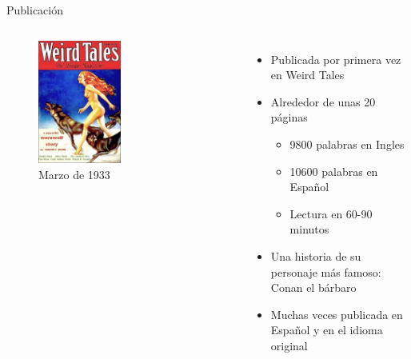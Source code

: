 \begin{frame}{Publicación}
\begin{columns}
    \begin{figure}[htb]
    \centering
        \includegraphics[width=0.5\textwidth]{img/WeirdTales-1933-03}
        \caption{Marzo de 1933}
    \end{figure}
    \begin{itemize}
         \item Publicada por primera vez en Weird Tales
         \item Alrededor de unas 20 páginas
         \begin{itemize}
            \item 9800 palabras en Ingles
            \item 10600 palabras en Español
            \item Lectura en 60-90 minutos
         \end{itemize}
         \item Una historia de su personaje más famoso: Conan el bárbaro
         \item Muchas veces publicada en Español y en el idioma original
    \end{itemize}
\end{columns}
\end{frame}

